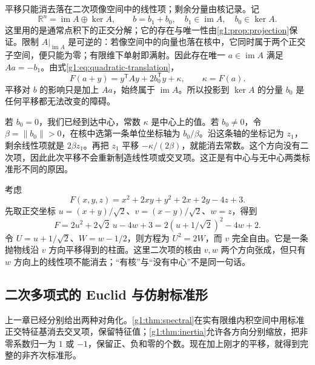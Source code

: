 平移只能消去落在二次项像空间中的线性项；剩余分量由核记录。记
\[
	\mathbb R^n=\operatorname{im}A\oplus\ker A,
	\qquad b=b_1+b_0,
	\quad b_1\in\operatorname{im}A,\quad b_0\in\ker A.
\]
这里用的是通常点积下的正交分解；它的存在与唯一性由\cref{g1:prop:projection}保证。限制 \(A|_{\operatorname{im}A}\) 是可逆的：若像空间中的向量也落在核中，它同时属于两个正交子空间，便只能为零；有限维下单射即满射。因此存在唯一 \(a\in\operatorname{im}A\) 满足 \(Aa=-b_1\)。由式\eqref{g1:eq:quadratic-translation}，
\begin{equation}
	\label{g1:eq:residual-linear-term}
	F(a+y)=y^{\mathsf T}Ay+2b_0^{\mathsf T}y+\kappa,
	\qquad \kappa=F(a).
\end{equation}
平移对 \(b\) 的影响只是加上 \(Aa\)，始终属于 \(\operatorname{im}A\)。所以投影到 \(\ker A\) 的分量 \(b_0\) 是任何平移都无法改变的障碍。

\ProseParagraphBreak

若 \(b_0=0\)，我们已经到达中心，常数 \(\kappa\) 是中心上的值。若 \(b_0\ne0\)，令 \(\beta=\lVert b_0\rVert>0\)，在核中选第一条单位坐标轴为 \(b_0/\beta\)。沿这条轴的坐标记为 \(z_1\)，剩余线性项就是 \(2\beta z_1\)。再把 \(z_1\) 平移 \(-\kappa/(2\beta)\)，就能消去常数。这个方向没有二次项，因此此次平移不会重新制造线性项或交叉项。这正是有中心与无中心两类标准形不同的原因。

\begin{example}
	\label{g1:exm:parabolic-completion}
	考虑
	\[
		F(x,y,z)=x^2+2xy+y^2+2x+2y-4z+3.
	\]
	先取正交坐标 \(u=(x+y)/\sqrt2\)、\(v=(x-y)/\sqrt2\)、\(w=z\)，得到
	\[
		F=2u^2+2\sqrt2\,u-4w+3
		=2(u+1/\sqrt2)^2-4w+2.
	\]
	令 \(U=u+1/\sqrt2\)、\(W=w-1/2\)，则方程为 \(U^2=2W\)，而 \(v\) 完全自由。它是一条抛物线沿 \(v\) 方向平移得到的柱面。这里二次项的核由 \(v,w\) 两个方向张成，但只有 \(w\) 方向上的线性项不能消去；“有核”与“没有中心”不是同一句话。
\end{example}

\subsection{二次多项式的 Euclid 与仿射标准形}
\label{g1:subsec:0202:03}

上一章已经分别给出两种对角化。\cref{g1:thm:spectral}在实有限维内积空间中用标准正交特征基消去交叉项，保留特征值；\cref{g1:thm:inertia}允许各方向分别缩放，把非零系数归一为 \(1\) 或 \(-1\)，保留正、负和零的个数。现在加上刚才的平移，就得到完整的非齐次标准形。

